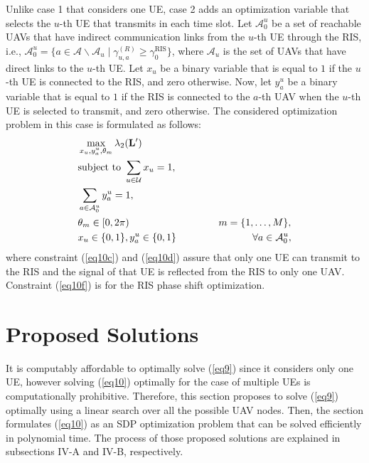 \documentclass[conference]{IEEEtran}
\begin{document}
Unlike case 1 that considers one UE, case 2 adds an optimization variable that selects the $u$-th UE that transmits in each time slot.  Let $\mathcal A^u_0$ be a set of reachable UAVs that have indirect communication links from the $u$-th UE through the RIS, i.e., $\mathcal A^u_0 =\{a\in \mathcal A\backslash \mathcal A_{u} \mid \gamma^{(R)}_{u,a} \geq \gamma^\text{RIS}_{0}\}$, where $\mathcal A_{u}$ is the set of UAVs that have direct links to the $u$-th UE.
Let  $x_u$ be a binary variable that is equal to $1$ if the $u$-th UE is connected to the RIS, and zero otherwise. Now, let  $y^u_a$ be a binary variable that is equal to $1$ if the RIS is connected to the $a$-th UAV when the $u$-th UE is selected to transmit, and zero otherwise. The considered optimization problem in this case is formulated as follows:
\begin{subequations}
\label{eq10}
\begin{align}
&\max_{\substack{x_u, y^u_a, \theta_m}}  \lambda_2(\mathbf L')
\label{eq10a} \\
 &{\rm subject~to\ } \sum_{u \in \mathcal U}x_u=1, \label{eq10c}\\
& \sum_{a \in \mathcal A^u_0}y^u_a=1, \label{eq10d}\\
& \theta_m \in [0, 2\pi)~~~~~~~~~~~~~~~~~~~~~~~~~~~ m=\{1, \ldots, M\}, \label{eq10f}\\
& x_u \in \{0,1 \}, y^u_a \in \{0, 1 \}  ~~~~~~~~~~~~~~~~~~~~~~~\forall a \in \mathcal A_0^u,
\end{align}
\end{subequations} 
where constraint (\ref{eq10c}) and (\ref{eq10d}) assure that only one UE can transmit to the RIS and the signal of that UE is reflected from the RIS to only one UAV.  Constraint (\ref{eq10f}) is for the RIS phase shift optimization.



\section{Proposed Solutions}
It is computably affordable to optimally solve (\ref{eq9}) since it considers only one UE, however solving (\ref{eq10}) optimally for the case of multiple UEs is computationally prohibitive. Therefore, this section proposes to solve (\ref{eq9}) optimally using a linear search over all the possible UAV nodes. Then, the section formulates (\ref{eq10}) as an SDP optimization problem that can be solved efficiently in polynomial time. The process of those proposed solutions are explained in subsections IV-A and IV-B, respectively. 
\end{document}
